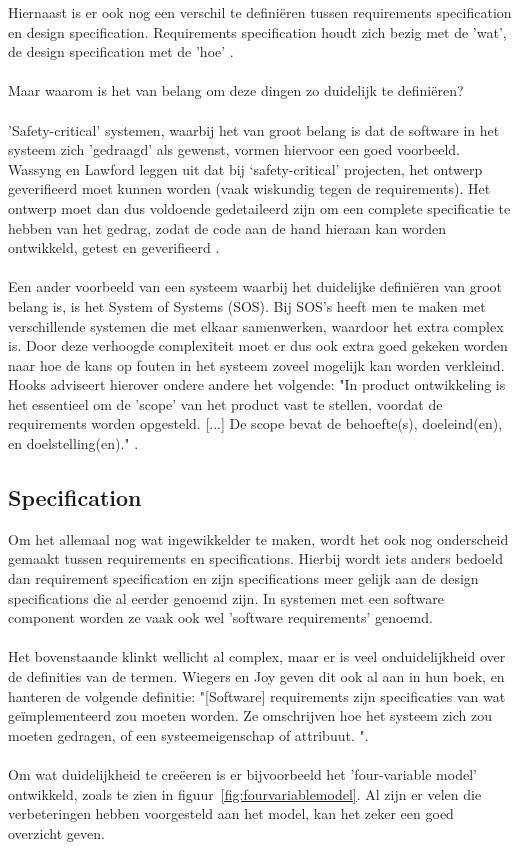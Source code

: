 \documentclass{article}
\begin{document}
    Hiernaast is er ook nog een verschil te definiëren tussen requirements specification en design specification. Requirements specification houdt zich bezig met de 'wat', de design specification met de 'hoe' \cite{hooks2015difference}. \\\\
    Maar waarom is het van belang om deze dingen zo duidelijk te definiëren? \\\\
    'Safety-critical' systemen, waarbij het van groot belang is dat de software in het systeem zich 'gedraagd’ als gewenst, vormen hiervoor een goed voorbeeld. Wassyng en Lawford leggen uit dat bij ‘safety-critical’ projecten, het ontwerp geverifieerd moet kunnen worden (vaak wiskundig tegen de requirements). Het ontwerp moet dan dus voldoende gedetaileerd zijn om een complete specificatie te hebben van het gedrag, zodat de code aan de hand hieraan kan worden ontwikkeld, getest en geverifieerd \cite{wassyng2006software}. \\\\
    Een ander voorbeeld van een systeem waarbij het duidelijke definiëren van groot belang is, is het System of Systems (SOS). Bij SOS's heeft men te maken met verschillende systemen die met elkaar samenwerken, waardoor het extra complex is. Door deze verhoogde complexiteit moet er dus ook extra goed gekeken worden naar hoe de kans op fouten in het systeem zoveel mogelijk kan worden verkleind. Hooks adviseert hierover ondere andere het volgende: "In product ontwikkeling is het essentieel om de 'scope' van het product vast te stellen, voordat de requirements worden opgesteld. [...] De scope bevat de behoefte(s), doeleind(en), en doelstelling(en)."  \cite{hooks2004sos}. \\


  \subsection{Specification}
    Om het allemaal nog wat ingewikkelder te maken, wordt het ook nog onderscheid gemaakt tussen requirements en specifications. Hierbij wordt iets anders bedoeld dan requirement specification en zijn specifications meer gelijk aan de design specifications die al eerder genoemd zijn. In systemen met een software component worden ze vaak ook wel 'software requirements' genoemd. \\\\
    Het bovenstaande klinkt wellicht al complex, maar er is veel onduidelijkheid over de definities van de termen. Wiegers en Joy geven dit ook al aan in hun boek, en hanteren de volgende definitie: "[Software] requirements zijn specificaties van wat geïmplementeerd zou moeten worden. Ze omschrijven hoe het systeem zich zou moeten gedragen, of een systeemeigenschap of attribuut. \cite{wiegers2013software}". \\\\
    Om wat duidelijkheid te creëeren is er bijvoorbeeld het 'four-variable model' ontwikkeld, zoals te zien in figuur~\ref{fig:fourvariablemodel}. Al zijn er velen die verbeteringen hebben voorgesteld aan het model, kan het zeker een goed overzicht geven. \\
\end{document}
